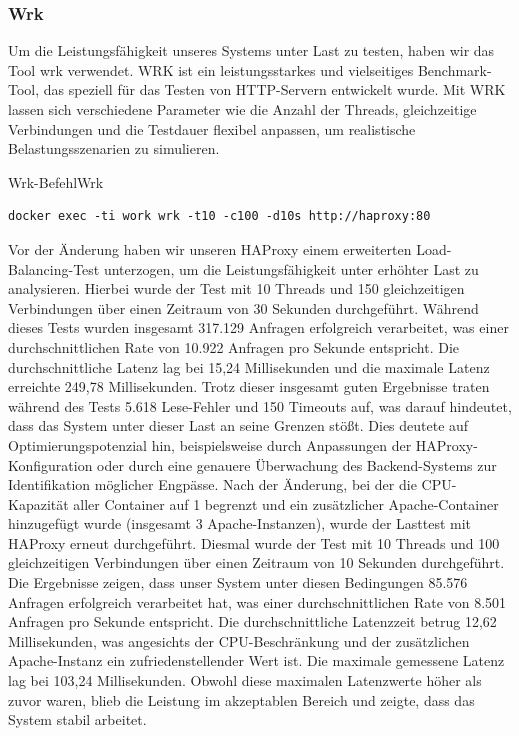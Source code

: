 \subsubsection{Wrk}

Um die Leistungsfähigkeit unseres Systems unter Last zu testen, haben wir das Tool wrk verwendet. WRK ist ein leistungsstarkes und vielseitiges Benchmark-Tool, das speziell für das Testen von HTTP-Servern entwickelt wurde. Mit WRK lassen sich verschiedene Parameter wie die Anzahl der Threads, gleichzeitige Verbindungen und die Testdauer flexibel anpassen, um realistische Belastungsszenarien zu simulieren.

\begin{code}{Wrk-Befehl}{Wrk}
        \begin{verbatim}
docker exec -ti work wrk -t10 -c100 -d10s http://haproxy:80
        \end{verbatim}
\end{code}
Vor der Änderung haben wir unseren HAProxy einem erweiterten Load-Balancing-Test unterzogen, um die Leistungsfähigkeit unter erhöhter Last zu analysieren. Hierbei wurde der Test mit 10 Threads und 150 gleichzeitigen Verbindungen über einen Zeitraum von 30 Sekunden durchgeführt. Während dieses Tests wurden insgesamt 317.129 Anfragen erfolgreich verarbeitet, was einer durchschnittlichen Rate von 10.922 Anfragen pro Sekunde entspricht. Die durchschnittliche Latenz lag bei 15,24 Millisekunden und die maximale Latenz erreichte 249,78 Millisekunden. Trotz dieser insgesamt guten Ergebnisse traten während des Tests 5.618 Lese-Fehler und 150 Timeouts auf, was darauf hindeutet, dass das System unter dieser Last an seine Grenzen stößt. Dies deutete auf Optimierungspotenzial hin, beispielsweise durch Anpassungen der HAProxy-Konfiguration oder durch eine genauere Überwachung des Backend-Systems zur Identifikation möglicher Engpässe.
Nach der Änderung, bei der die CPU-Kapazität aller Container auf 1 begrenzt und ein zusätzlicher Apache-Container hinzugefügt wurde (insgesamt 3 Apache-Instanzen), wurde der Lasttest mit HAProxy erneut durchgeführt. Diesmal wurde der Test mit 10 Threads und 100 gleichzeitigen Verbindungen über einen Zeitraum von 10 Sekunden durchgeführt. Die Ergebnisse zeigen, dass unser System unter diesen Bedingungen 85.576 Anfragen erfolgreich verarbeitet hat, was einer durchschnittlichen Rate von 8.501 Anfragen pro Sekunde entspricht. Die durchschnittliche Latenzzeit betrug 12,62 Millisekunden, was angesichts der CPU-Beschränkung und der zusätzlichen Apache-Instanz ein zufriedenstellender Wert ist. Die maximale gemessene Latenz lag bei 103,24 Millisekunden. Obwohl diese maximalen Latenzwerte höher als zuvor waren, blieb die Leistung im akzeptablen Bereich und zeigte, dass das System stabil arbeitet.
